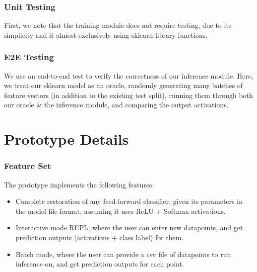 \documentclass{beamer}
\begin{document}
\begin{frame}
  \frametitle{Unit Testing}

  First, we note that the training module does not require testing, due to its simplicity and it almost exclusively using sklearn library functions.\medskip
  


\end{frame}

\begin{frame}
  \frametitle{E2E Testing}

  We use an end-to-end test to verify the correctness of our inference module. Here, we treat our sklearn model as an oracle, randomly generating many batches of feature vectors (in addition to the existing test split), running them through both our oracle \& the inference module, and comparing the output activations.

\end{frame}

\section{Prototype Details}

\begin{frame}
  \frametitle{Feature Set}

  The prototype implements the following features:
  \begin{itemize}
    \item Complete restoration of any feed-forward classifier, given its parameters in the model file format, assuming it uses ReLU + Softmax activations.
    \item Interactive mode REPL, where the user can enter new datapoints, and get prediction outputs (activations + class label) for them.
    \item Batch mode, where the user can provide a csv file of datapoints to run inference on, and get prediction outputs for each point.
  \end{itemize}
\end{frame}
\end{document}
